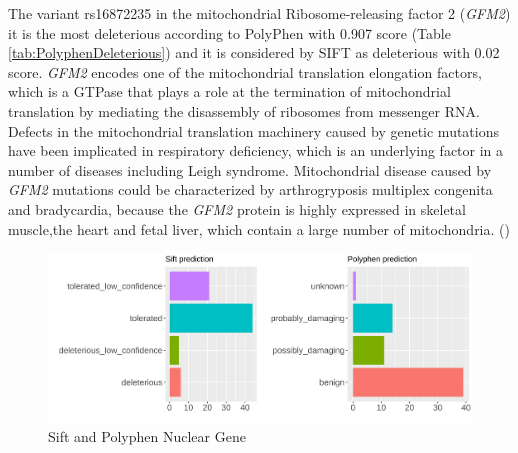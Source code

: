 The variant rs16872235 in the mitochondrial Ribosome-releasing factor 2 (\textit{GFM2}) it is the most deleterious according to PolyPhen with 0.907 score  (Table \ref{tab:PolyphenDeleterious}) and it is considered by SIFT as deleterious with 0.02 score.
\textit{GFM2} encodes one of the mitochondrial translation elongation factors, which is a GTPase that plays a role at the termination of mitochondrial translation by mediating the disassembly of ribosomes from messenger RNA. 
Defects in the mitochondrial translation machinery caused by
genetic mutations have been implicated in respiratory deficiency,
which is an underlying factor in a number of diseases including Leigh syndrome. 
Mitochondrial disease caused by \textit{GFM2} mutations could be characterized by arthrogryposis multiplex congenita and bradycardia, because the \textit{GFM2} protein is highly expressed in skeletal muscle,the heart and fetal liver, which contain a large number of mitochondria. (\cite{fukumura2015compound}) \\




\begin{figure}[h]
\includegraphics[width=\textwidth]{Fig/nuclear_SiftPoly.png}
\caption{Sift and Polyphen Nuclear Gene}
\label{fig:siftpolyphen_nuclear}
\end{figure}\\





